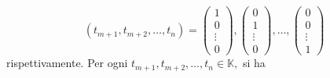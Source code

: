 \documentclass{article}
\theoremstyle{plain}
\theoremstyle{definition}
\theoremstyle{remark}
\begin{document}
\[
    (t_{m+1}, t_{m+2}, \ldots, t_n) =
        \begin{pmatrix}
            1\\
            0\\
            \vdots\\
            0
        \end{pmatrix},
        \begin{pmatrix}
            0\\
            1\\
            \vdots\\
            0
        \end{pmatrix},\ldots,
        \begin{pmatrix}
            0\\
            0\\
            \vdots\\
            1
        \end{pmatrix}
\]
rispettivamente.
Per ogni \( t_{m+1}, t_{m+2}, \ldots, t_n \in \mathbb{K}, \) si ha
\end{document}
